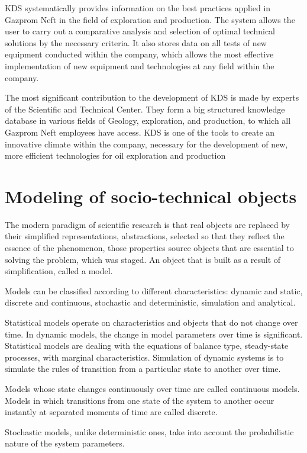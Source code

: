 \documentclass[12pt]{report}
\theoremstyle{definition}
\begin{document}
KDS systematically provides information on the best practices applied in Gazprom Neft in the field of exploration and production. 
The system allows the user to carry out a comparative analysis and selection of optimal technical solutions by the necessary criteria. It also stores data on all tests of new equipment conducted within the company, which allows the most effective implementation of new equipment and technologies at any field within the company.

The most significant contribution to the development of KDS is made by experts of the Scientific and Technical Center. 
They form a big structured knowledge database in various fields of Geology, exploration, and production, to which all Gazprom Neft employees have access. 
KDS is one of the tools to create an innovative climate within the company, necessary for the development of new, more efficient technologies for oil exploration and production

\section{Modeling of socio-technical objects}

The modern paradigm of scientific research is that real objects are replaced by their simplified representations, abstractions, selected so that they reflect the essence of the phenomenon, those properties source objects that are essential to solving the problem, which was staged.
An object that is built as a result of simplification, called a model.

Models can be classified according to different characteristics: dynamic and static, discrete and continuous, stochastic and deterministic, simulation and analytical. 

Statistical models operate on characteristics and objects that do not change over time. 
In dynamic models, the change in model parameters over time is significant.
Statistical models are dealing with the equations of balance type, steady-state processes, with marginal characteristics.
Simulation of dynamic systems is to simulate the rules of transition from a particular state to another over time.

Models whose state changes continuously over time are called continuous models. 
Models in which transitions from one state of the system to another occur instantly at separated moments of time are called discrete.

Stochastic models, unlike deterministic ones, take into account the probabilistic nature of the system parameters.
\end{document}
